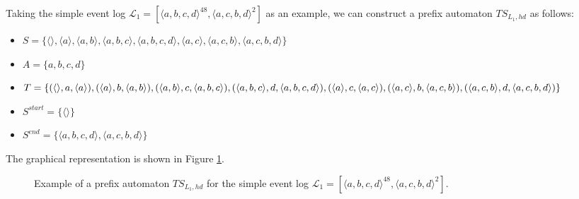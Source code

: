Taking the simple event log $\mathcal{L}_1 = [ \langle a, b, c, d \rangle ^{48}, \langle a, c, b, d \rangle^2 ]$ as an example, we can construct a prefix automaton $\mathit{TS}_{L_1, hd}$ as follows:

\begin{itemize}
    \item $S = \{ \langle \rangle, \langle a \rangle, \langle a, b \rangle, \langle a, b, c \rangle, \langle a, b, c, d \rangle, \langle a, c \rangle, \langle a, c, b \rangle, \langle a, c, b, d \rangle \}$
    \item $A = \{ a, b, c, d \}$
    \item $T = \{ (\langle \rangle, a, \langle a \rangle), (\langle a \rangle, b, \langle a, b \rangle), (\langle a, b \rangle, c, \langle a, b, c \rangle), (\langle a, b, c \rangle, d, \langle a, b, c, d \rangle), (\langle a \rangle, c, \langle a, c \rangle), \\ (\langle a, c \rangle, b, \langle a, c, b \rangle), (\langle a, c, b \rangle, d, \langle a, c, b, d \rangle) \}$
    \item $S^{start} = \{ \langle \rangle \}$
    \item $S^{end} = \{ \langle a, b, c, d \rangle, \langle a, c, b, d \rangle \}$
\end{itemize}

The graphical representation is shown in Figure \ref{fig:example_prefix_automaton}.

\begin{figure}
    \centering
    \caption{Example of a prefix automaton $\mathit{TS}_{L_1, hd}$ for the simple event log $\mathcal{L}_1 = [ \langle a, b, c, d \rangle ^{48}, \langle a, c, b, d \rangle^2 ]$.}
    \label{fig:example_prefix_automaton}
\end{figure}

